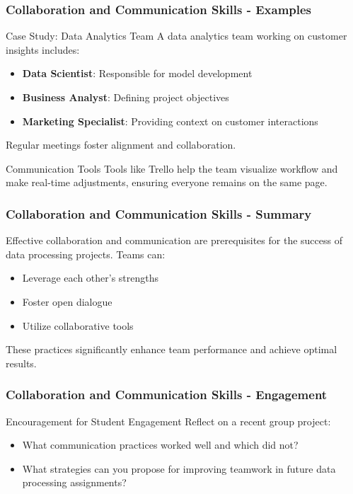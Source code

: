 \documentclass{beamer}
\begin{document}
\begin{frame}[fragile]
    \frametitle{Collaboration and Communication Skills - Examples}
    \begin{block}{Case Study: Data Analytics Team}
        A data analytics team working on customer insights includes:
        \begin{itemize}
            \item \textbf{Data Scientist}: Responsible for model development
            \item \textbf{Business Analyst}: Defining project objectives
            \item \textbf{Marketing Specialist}: Providing context on customer interactions
        \end{itemize}
        Regular meetings foster alignment and collaboration.
    \end{block}

    \begin{block}{Communication Tools}
        Tools like Trello help the team visualize workflow and make real-time adjustments, ensuring everyone remains on the same page.
    \end{block}
\end{frame}

\begin{frame}[fragile]
    \frametitle{Collaboration and Communication Skills - Summary}
    Effective collaboration and communication are prerequisites for the success of data processing projects. Teams can:
    \begin{itemize}
        \item Leverage each other’s strengths
        \item Foster open dialogue
        \item Utilize collaborative tools
    \end{itemize}
    These practices significantly enhance team performance and achieve optimal results.
\end{frame}

\begin{frame}[fragile]
    \frametitle{Collaboration and Communication Skills - Engagement}
    \begin{block}{Encouragement for Student Engagement}
        Reflect on a recent group project:
        \begin{itemize}
            \item What communication practices worked well and which did not?
            \item What strategies can you propose for improving teamwork in future data processing assignments?
        \end{itemize}
    \end{block}
\end{frame}
\end{document}
